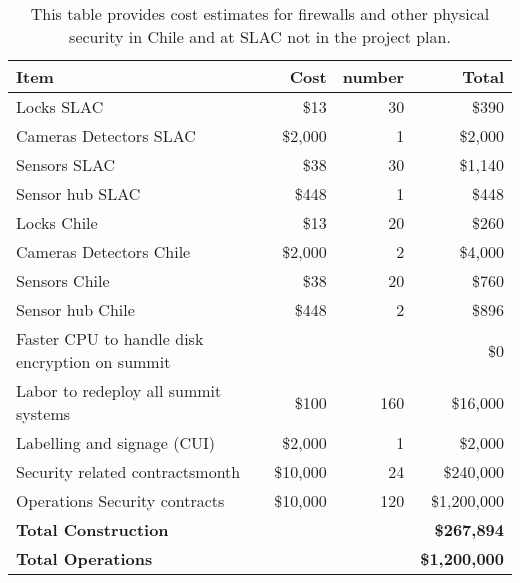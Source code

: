 \tiny \begin{longtable} {|p{}|r|r|r|} \caption{This table provides cost estimates for firewalls and other physical security in Chile and at SLAC not in the project plan. \label{tab:firewalls}}\\ 
\hline 
\textbf{Item}&\textbf{Cost}&\textbf{number}&\textbf{Total} \\ \hline
{Locks SLAC}&{\$13}&{30}&{\$390} \\ \hline
{Cameras Detectors  SLAC}&{\$2,000}&{1}&{\$2,000} \\ \hline
{Sensors SLAC}&{\$38}&{30}&{\$1,140} \\ \hline
{Sensor hub SLAC}&{\$448}&{1}&{\$448} \\ \hline
{Locks Chile}&{\$13}&{20}&{\$260} \\ \hline
{Cameras Detectors Chile}&{\$2,000}&{2}&{\$4,000} \\ \hline
{Sensors Chile}&{\$38}&{20}&{\$760} \\ \hline
{Sensor hub Chile}&{\$448}&{2}&{\$896} \\ \hline
{Faster CPU to handle disk encryption on summit}&{}&{}&{\$0} \\ \hline
{Labor to redeploy all summit systems}&{\$100}&{160}&{\$16,000} \\ \hline
{Labelling and signage (CUI)}&{\$2,000}&{1}&{\$2,000} \\ \hline
{Security related contracts\/month}&{\$10,000}&{24}&{\$240,000} \\ \hline
{Operations Security contracts}&{\$10,000}&{120}&{\$1,200,000} \\ \hline
\textbf{Total Construction}&\textbf{}&\textbf{}&\textbf{\$267,894} \\ \hline
\textbf{Total Operations}&\textbf{}&\textbf{}&\textbf{\$1,200,000} \\ \hline
\end{longtable} \normalsize
